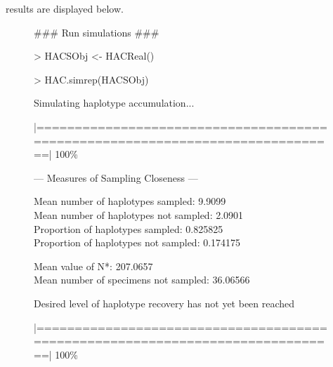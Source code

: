  results are displayed below.

\vspace{3mm}

\begin{figure}[H]

{\scriptsize \tt

{\noindent \#\#\# Run simulations \#\#\#}

\vspace{1mm}

{\noindent > HACSObj <- HACReal()}

\vspace{1mm}

{\noindent > HAC.simrep(HACSObj)} 

\vspace{1mm}

\noindent Simulating haplotype accumulation...

\vspace{2mm}
 
\noindent |==============================================================================| 100\%
  
\vspace{3mm}
 
\noindent --- Measures of Sampling Closeness ---

\vspace{2mm} 
 
\noindent Mean number of haplotypes sampled: 9.9099  \\
Mean number of haplotypes not sampled: 2.0901  \\
Proportion of haplotypes sampled: 0.825825 \\
Proportion of haplotypes not sampled: 0.174175     

\vspace{2mm} 
 
\noindent Mean value of N*: 207.0657  \\
Mean number of specimens not sampled: 36.06566

\vspace{3mm}
 
\noindent Desired level of haplotype recovery has not yet been reached 

\vspace{2mm}

\noindent |==============================================================================| 100\%

\vspace{3mm}

}
\end{figure}
